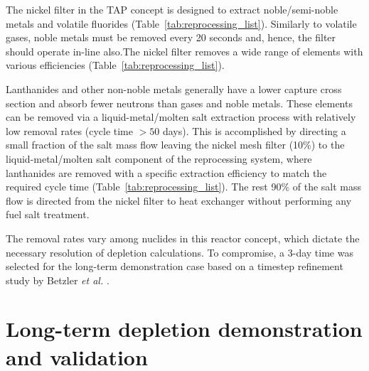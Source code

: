 The nickel filter in the \gls{TAP} concept is designed to extract 
noble/semi-noble metals and volatile fluorides 
(Table~\ref{tab:reprocessing_list}). Similarly to volatile gases, 
noble metals must be removed every 20 seconds and, hence, the filter should 
operate in-line also.The nickel filter removes a wide range of elements with 
various efficiencies (Table~\ref{tab:reprocessing_list}).

Lanthanides and other non-noble metals generally have a lower capture  
cross section and absorb fewer neutrons than gases and noble metals. These 
elements can be removed via a liquid-metal/molten salt extraction process with 
relatively low removal rates (cycle time $> 50$ days). This is accomplished 
by directing a small fraction of the salt mass flow leaving the nickel mesh 
filter (10\%) to the liquid-metal/molten salt component of the reprocessing 
system, where lanthanides are removed with a specific extraction efficiency to 
match the  required cycle time (Table~\ref{tab:reprocessing_list}). The rest 
90\% of the salt mass flow is directed from the nickel filter to heat 
exchanger without performing any fuel salt treatment.

The removal rates vary among nuclides in this reactor concept, which dictate 
the necessary resolution of depletion calculations. To compromise, a 3-day 
time was selected for the long-term demonstration case based on a timestep 
refinement study by Betzler \emph{et al.} \cite{betzler_assessment_2017-1}.

\section{Long-term depletion demonstration and validation}
